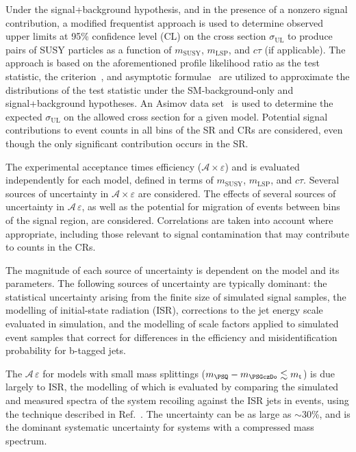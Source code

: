 Under the signal+background hypothesis, and in the presence of a
nonzero signal contribution, a modified frequentist approach is used
to determine observed upper limits at 95\% confidence level (CL) on
the cross section $\sigma_\text{UL}$ to produce pairs of SUSY
particles as a function of $m_\text{SUSY}$, $m_\text{LSP}$, and
$c\tau$ (if applicable). The approach is based on the aforementioned
profile likelihood ratio as the test statistic, the \cls
criterion~\cite{junk, read}, and asymptotic
formulae~\cite{Cowan:2010js} are utilized to approximate the
distributions of the test statistic under the SM-background-only and
signal+background hypotheses.  An Asimov data set~\cite{Cowan:2010js}
is used to determine the expected $\sigma_\text{UL}$ on the allowed
cross section for a given model. Potential signal contributions to
event counts in all bins of the SR and CRs are considered, even though
the only significant contribution occurs in the SR.

The experimental acceptance times efficiency ($\mathcal{A} \times
\varepsilon$) and is evaluated independently for each model, defined
in terms of $m_\text{SUSY}$, $m_\text{LSP}$, and $c\tau$. Several
sources of uncertainty in $\mathcal{A}\times\varepsilon$ are
considered. The effects of several sources of uncertainty in
$\mathcal{A}\,\varepsilon$, as well as the potential for migration of
events between bins of the signal region, are considered. Correlations
are taken into account where appropriate, including those relevant to
signal contamination that may contribute to counts in the CRs.

The magnitude of each source of uncertainty is dependent on the model
and its parameters. The following sources of uncertainty are typically
dominant: the statistical uncertainty arising from the finite size of
simulated signal samples, the modelling of initial-state radiation
(ISR), corrections to the jet energy scale evaluated in simulation,
and the modelling of scale factors applied to simulated event samples
that correct for differences in the efficiency and misidentification
probability for b-tagged jets. 

The $\mathcal{A}\,\varepsilon$ for models with small mass splittings
(\eg $m_{\PSQ} - m_{\PSGczDo} \lesssim m_{\text t}$) is due largely to
ISR, the modelling of which is evaluated by comparing the simulated
and measured \pt spectra of the system recoiling against the ISR jets
in \ttbar events, using the technique described in
Ref.~\cite{single-lepton-stop}. The uncertainty can be as large as
$\sim$30\%, and is the dominant systematic uncertainty for systems
with a compressed mass spectrum.


